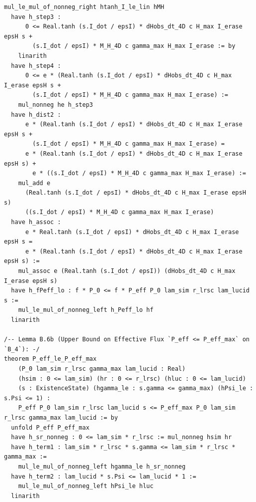 \documentclass[11pt,a4paper]{article}
\theoremstyle{definition}
\begin{document}
\begin{lstlisting}[language=Lean4]
    mul_le_mul_of_nonneg_right htanh_I_le_lin hMH
  have h_step3 :
      0 <= Real.tanh (s.I_dot / epsI) * dHobs_dt_4D c H_max I_erase epsH s +
        (s.I_dot / epsI) * M_H_4D c gamma_max H_max I_erase := by
    linarith
  have h_step4 :
      0 <= e * (Real.tanh (s.I_dot / epsI) * dHobs_dt_4D c H_max I_erase epsH s +
        (s.I_dot / epsI) * M_H_4D c gamma_max H_max I_erase) :=
    mul_nonneg he h_step3
  have h_dist2 :
      e * (Real.tanh (s.I_dot / epsI) * dHobs_dt_4D c H_max I_erase epsH s +
        (s.I_dot / epsI) * M_H_4D c gamma_max H_max I_erase) =
      e * (Real.tanh (s.I_dot / epsI) * dHobs_dt_4D c H_max I_erase epsH s) +
        e * ((s.I_dot / epsI) * M_H_4D c gamma_max H_max I_erase) :=
    mul_add e
      (Real.tanh (s.I_dot / epsI) * dHobs_dt_4D c H_max I_erase epsH s)
      ((s.I_dot / epsI) * M_H_4D c gamma_max H_max I_erase)
  have h_assoc :
      e * Real.tanh (s.I_dot / epsI) * dHobs_dt_4D c H_max I_erase epsH s =
      e * (Real.tanh (s.I_dot / epsI) * dHobs_dt_4D c H_max I_erase epsH s) :=
    mul_assoc e (Real.tanh (s.I_dot / epsI)) (dHobs_dt_4D c H_max I_erase epsH s)
  have h_fPeff_lo : f * P_0 <= f * P_eff P_0 lam_sim r_lrsc lam_lucid s :=
    mul_le_mul_of_nonneg_left h_Peff_lo hf
  linarith

/-- Lemma B.6b (Upper Bound on Effective Flux `P_eff <= P_eff_max` on `B_4`): -/
theorem P_eff_le_P_eff_max
    (P_0 lam_sim r_lrsc gamma_max lam_lucid : Real)
    (hsim : 0 <= lam_sim) (hr : 0 <= r_lrsc) (hluc : 0 <= lam_lucid)
    (s : ExistenceState) (hgamma_le : s.gamma <= gamma_max) (hPsi_le : s.Psi <= 1) :
    P_eff P_0 lam_sim r_lrsc lam_lucid s <= P_eff_max P_0 lam_sim r_lrsc gamma_max lam_lucid := by
  unfold P_eff P_eff_max
  have h_sr_nonneg : 0 <= lam_sim * r_lrsc := mul_nonneg hsim hr
  have h_term1 : lam_sim * r_lrsc * s.gamma <= lam_sim * r_lrsc * gamma_max :=
    mul_le_mul_of_nonneg_left hgamma_le h_sr_nonneg
  have h_term2 : lam_lucid * s.Psi <= lam_lucid * 1 :=
    mul_le_mul_of_nonneg_left hPsi_le hluc
  linarith


\end{lstlisting}
\end{document}
